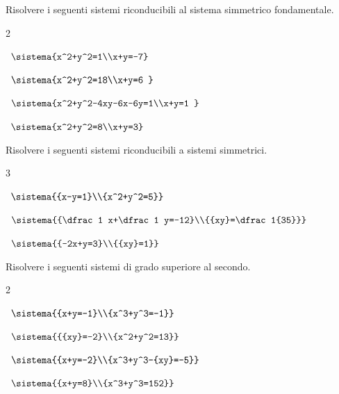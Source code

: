 \begin{esercizio}[*]
\label{ese:6.24}
Risolvere i seguenti sistemi riconducibili al sistema simmetrico 
fondamentale.
\begin{htmulticols}{2}
\begin{enumeratea}
\item~\(\sistema{x^2+y^2=1\\x+y=-7}\)
\item~\(\sistema{x^2+y^2=18\\x+y=6 }\)
\item~\(\sistema{x^2+y^2-4xy-6x-6y=1\\x+y=1 
}\)
\item~\(\sistema{x^2+y^2=8\\x+y=3}\)
\end{enumeratea}
\end{htmulticols}
\end{esercizio}

\begin{esercizio}[*]
\label{ese:6.25}
Risolvere i seguenti sistemi riconducibili a sistemi simmetrici.
\begin{htmulticols}{3}
\begin{enumeratea}
\item~\(\sistema{{x-y=1}\\{x^2+y^2=5}}\)
\item~\(\sistema{{\dfrac 1 x+\dfrac 1 y=-12}\\{{xy}=\dfrac 
1{35}}}\)
\item~\(\sistema{{-2x+y=3}\\{{xy}=1}}\)
\end{enumeratea}
\end{htmulticols}
\end{esercizio}

\begin{esercizio}[*]
\label{ese:6.26}
Risolvere i seguenti sistemi di grado superiore al secondo.
\begin{htmulticols}{2}
\begin{enumeratea}
\item~\(\sistema{{x+y=-1}\\{x^3+y^3=-1}}\)

\item~\(\sistema{{{xy}=-2}\\{x^2+y^2=13}}\)


\item~\(\sistema{{x+y=-2}\\{x^3+y^3-{xy}=-5}}\)
\item~\(\sistema{{x+y=8}\\{x^3+y^3=152}}\)
\end{enumeratea}
\end{htmulticols}
\end{esercizio}

